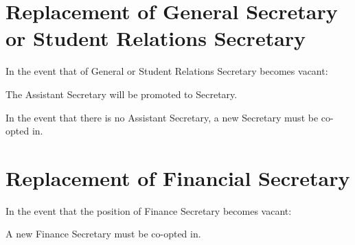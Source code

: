 \section{Replacement of General Secretary or Student Relations Secretary}
In the event that of General or Student Relations Secretary becomes vacant:
	\begin{legal}
	\item The Assistant Secretary will be promoted to Secretary.
	\item In the event that there is no Assistant Secretary, a new Secretary must be co-opted in.
	\end{legal}

\section{Replacement of Financial Secretary}
In the event that the position of Finance Secretary becomes vacant:
	\begin{legal}
	\item A new Finance Secretary must be co-opted in.
	\end{legal}